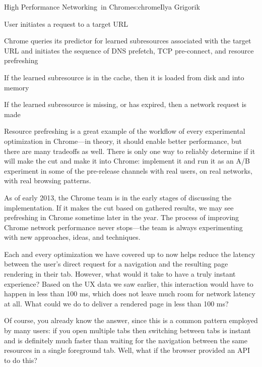 \begin{aosachapter}{High Performance Networking~in Chrome}{s:chrome}{Ilya Grigorik}
\begin{aosaitemize}

\item
  User initiates a request to a target URL
\item
  Chrome queries its predictor for learned subresources associated with
  the target URL and initiates the sequence of DNS prefetch, TCP
  pre-connect, and resource prefreshing
\item
  If the learned subresource is in the cache, then it is loaded from
  disk and into memory
\item
  If the learned subresource is missing, or has expired, then a network
  request is made
\end{aosaitemize}

Resource prefreshing is a great example of the workflow of every
experimental optimization in Chrome---in theory, it should enable better
performance, but there are many tradeoffs as well. There is only one way
to reliably determine if it will make the cut and make it into Chrome:
implement it and run it as an A/B experiment in some of the pre-release
channels with real users, on real networks, with real browsing patterns.

As of early 2013, the Chrome team is in the early stages of discussing
the implementation. If it makes the cut based on gathered results, we
may see prefreshing in Chrome sometime later in the year. The process of
improving Chrome network performance never stops---the team is always
experimenting with new approaches, ideas, and techniques.


Each and every optimization we have covered up to now helps reduce the
latency between the user's direct request for a navigation and the
resulting page rendering in their tab. However, what would it take to
have a truly instant experience? Based on the UX data we saw earlier,
this interaction would have to happen in less than 100 ms, which does
not leave much room for network latency at all. What could we do to
deliver a rendered page in less than 100 ms?

Of course, you already know the answer, since this is a common pattern
employed by many users: if you open multiple tabs then switching between
tabs is instant and is definitely much faster than waiting for the
navigation between the same resources in a single foreground tab. Well,
what if the browser provided an API to do this?


\end{aosachapter}
